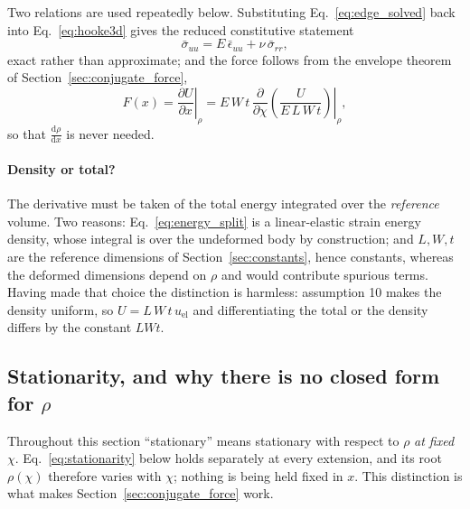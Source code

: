 \documentclass[11pt]{article}
\begin{document}
Two relations are used repeatedly below. Substituting
Eq.~\eqref{eq:edge_solved} back into Eq.~\eqref{eq:hooke3d} gives the reduced
constitutive statement
\begin{equation}\label{eq:sig_uu_poisson}
    \boxed{\;\bar\sigma_{uu} = E\,\bar\epsilon_{uu} + \nu\,\bar\sigma_{rr},\;}
\end{equation}
exact rather than approximate; and the force follows from the envelope theorem of
Section~\ref{sec:conjugate_force},
\begin{equation}\label{eq:F_from_U}
    \boxed{\;F(x) = \left.\frac{\partial U}{\partial x}\right|_{\rho}
    = E\,W\,t\,\left.\frac{\partial}{\partial \chi}
      \left(\frac{U}{E\,L\,W\,t}\right)\right|_{\rho},\;}
\end{equation}
so that $\frac{\mathrm d\rho}{\mathrm dx}$ is never needed.

\paragraph{Density or total?} The derivative must be taken of the total energy
integrated over the \emph{reference} volume. Two reasons:
Eq.~\eqref{eq:energy_split} is a linear-elastic strain energy density, whose
integral is over the undeformed body by construction; and $L, W, t$ are the
reference dimensions of Section~\ref{sec:constants}, hence constants, whereas the
deformed dimensions depend on $\rho$ and would contribute spurious terms. Having
made that choice the distinction is harmless: assumption 10 makes the density
uniform, so $U = L\,W\,t\,u_{\mathrm{el}}$ and differentiating the total or the
density differs by the constant $L W t$.

\subsection{Stationarity, and why there is no closed form for
\texorpdfstring{$\rho$}{rho}}\label{sec:stationarity}
Throughout this section ``stationary'' means stationary with respect to $\rho$
\emph{at fixed} $\chi$. Eq.~\eqref{eq:stationarity} below holds separately at
every extension, and its root $\rho(\chi)$ therefore varies with $\chi$; nothing
is being held fixed in $x$. This distinction is what makes
Section~\ref{sec:conjugate_force} work.
\end{document}
